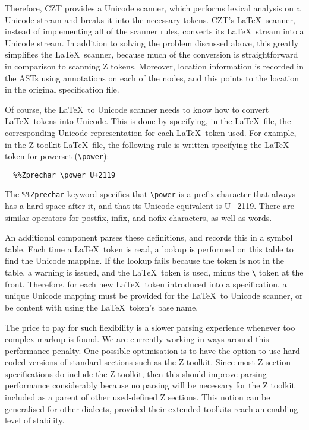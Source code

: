 \documentclass{llncs}
\begin{document}
Therefore, CZT provides a Unicode scanner, which performs lexical
analysis on a Unicode stream and breaks it into the necessary
tokens. CZT's \LaTeX~scanner, instead of implementing all of the
scanner rules, converts its \LaTeX~stream into a Unicode stream. In
addition to solving the problem discussed above, this greatly
simplifies the \LaTeX~scanner, because much of the conversion is
straightforward in comparison to scanning Z tokens. Moreover, location
information is recorded in the ASTs using annotations on each of the
nodes, and this points to the location in the original specification file.

Of course, the \LaTeX~to Unicode scanner needs to know how to convert
\LaTeX~tokens into Unicode. This is done by specifying, in the \LaTeX\ file,
the corresponding Unicode representation for each \LaTeX~token used. For example, in
the Z toolkit \LaTeX~file, the following rule is written specifying the \LaTeX~
token for powerset (\verb+\power+):
\begin{verbatim}
  %%Zprechar \power U+2119
\end{verbatim}
%
The {\tt \%\%Zprechar} keyword specifies that \verb+\power+ is a
prefix character that always has a hard space after it, and
that its Unicode equivalent is U+2119. There are similar operators for
postfix, infix, and nofix characters, as well as words.

An additional component parses these definitions, and records this in
a symbol table. Each time a \LaTeX~token is read, a lookup is
performed on this table to find the Unicode mapping. If the lookup
fails because the token is not in the table, a warning is issued, and
the \LaTeX~token is used, minus the \verb+\+ token at the
front. Therefore, for each new \LaTeX~token introduced into a
specification, a unique Unicode mapping must be provided for the
\LaTeX~to Unicode scanner, or be content with using the \LaTeX~token's
base name.

The price to pay for such flexibility is a slower parsing experience
whenever too complex markup is found.
We are currently working in ways around this performance penalty.
One possible optimisation is to have the option to use hard-coded versions
of standard sections such as the Z toolkit.
Since most Z section specifications do include the Z toolkit, then this should
improve parsing performance considerably because no parsing will be necessary for
the Z toolkit included as a parent of other used-defined Z sections.
This notion can be generalised for other dialects, provided their extended toolkits
reach an enabling level of stability.
\end{document}
